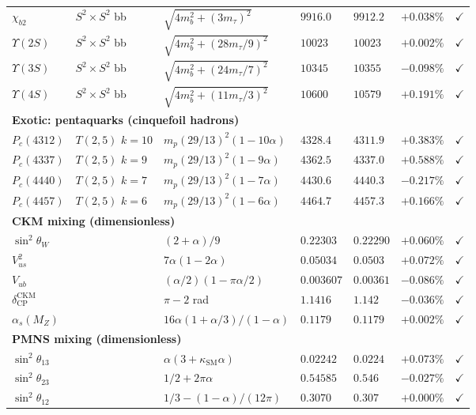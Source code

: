 \documentclass[11pt]{article}
\begin{document}
{\begin{longtable}{@{}p{1.2cm}p{2.4cm}p{4.8cm}p{1.6cm}p{1.4cm}rc@{}}
$\chi_{b2}$ & $S^2\times S^2$ bb & $\sqrt{4m_b^2+(3m_\tau)^2}$ & $9916.0$ & $9912.2$ & $+0.038\%$ & $\checkmark$ \\
$\Upsilon(2S)$ & $S^2\times S^2$ bb & $\sqrt{4m_b^2+(28m_\tau/9)^2}$ & $10023$ & $10023$ & $+0.002\%$ & $\checkmark$ \\
$\Upsilon(3S)$ & $S^2\times S^2$ bb & $\sqrt{4m_b^2+(24m_\tau/7)^2}$ & $10345$ & $10355$ & $-0.098\%$ & $\checkmark$ \\
$\Upsilon(4S)$ & $S^2\times S^2$ bb & $\sqrt{4m_b^2+(11m_\tau/3)^2}$ & $10600$ & $10579$ & $+0.191\%$ & $\checkmark$ \\
\multicolumn{7}{l}{\textbf{Exotic: pentaquarks (cinquefoil hadrons)}} \\
$P_c(4312)$ & $T(2,5)$ $k{=}10$ & $m_p(29/13)^2(1{-}10\alpha)$ & $4328.4$ & $4311.9$ & $+0.383\%$ & $\checkmark$ \\
$P_c(4337)$ & $T(2,5)$ $k{=}9$ & $m_p(29/13)^2(1{-}9\alpha)$ & $4362.5$ & $4337.0$ & $+0.588\%$ & $\checkmark$ \\
$P_c(4440)$ & $T(2,5)$ $k{=}7$ & $m_p(29/13)^2(1{-}7\alpha)$ & $4430.6$ & $4440.3$ & $-0.217\%$ & $\checkmark$ \\
$P_c(4457)$ & $T(2,5)$ $k{=}6$ & $m_p(29/13)^2(1{-}6\alpha)$ & $4464.7$ & $4457.3$ & $+0.166\%$ & $\checkmark$ \\
\multicolumn{7}{l}{\textbf{CKM mixing (dimensionless)}} \\
$\sin^2\theta_W$ &  & $(2{+}\alpha)/9$ & $0.22303$ & $0.22290$ & $+0.060\%$ & $\checkmark$ \\
$V_{us}^2$ &  & $7\alpha(1{-}2\alpha)$ & $0.05034$ & $0.0503$ & $+0.072\%$ & $\checkmark$ \\
$V_{ub}$ &  & $(\alpha/2)(1{-}\pi\alpha/2)$ & $0.003607$ & $0.00361$ & $-0.086\%$ & $\checkmark$ \\
$\delta_\text{CP}^\text{CKM}$ &  & $\pi{-}2$ rad & $1.1416$ & $1.142$ & $-0.036\%$ & $\checkmark$ \\
$\alpha_s(M_Z)$ &  & $16\alpha(1{+}\alpha/3)/(1{-}\alpha)$ & $0.1179$ & $0.1179$ & $+0.002\%$ & $\checkmark$ \\
\multicolumn{7}{l}{\textbf{PMNS mixing (dimensionless)}} \\
$\sin^2\theta_{13}$ &  & $\alpha(3{+}\kappa_\text{SM}\alpha)$ & $0.02242$ & $0.0224$ & $+0.073\%$ & $\checkmark$ \\
$\sin^2\theta_{23}$ &  & $1/2{+}2\pi\alpha$ & $0.54585$ & $0.546$ & $-0.027\%$ & $\checkmark$ \\
$\sin^2\theta_{12}$ &  & $1/3{-}(1{-}\alpha)/(12\pi)$ & $0.3070$ & $0.307$ & $+0.000\%$ & $\checkmark$ \\

\end{longtable}}
\end{document}
